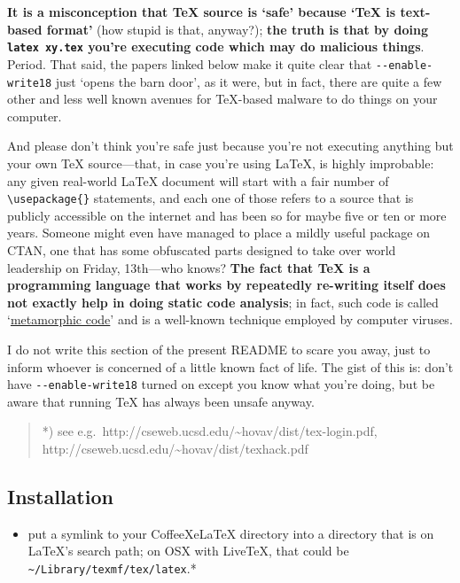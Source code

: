 \textbf{It is a misconception that TeX source is `safe' because `TeX is
text-based format'} (how stupid is that, anyway?); \textbf{the truth is
that by doing \texttt{latex xy.tex} you're executing code which may do
malicious things}. Period. That said, the papers linked below make it
quite clear that \texttt{-{}-enable-write18} just `opens the barn door',
as it were, but in fact, there are quite a few other and less well known
avenues for TeX-based malware to do things on your computer.

And please don't think you're safe just because you're not executing
anything but your own TeX source---that, in case you're using LaTeX, is
highly improbable: any given real-world LaTeX document will start with a
fair number of \texttt{\textbackslash{}usepackage\{\}} statements, and
each one of those refers to a source that is publicly accessible on the
internet and has been so for maybe five or ten or more years. Someone
might even have managed to place a mildly useful package on CTAN, one
that has some obfuscated parts designed to take over world leadership on
Friday, 13th---who knows? \textbf{The fact that TeX is a programming
language that works by repeatedly re-writing itself does not exactly
help in doing static code analysis}; in fact, such code is called
`\href{http://en.wikipedia.org/wiki/Metamorphic_code}{metamorphic code}'
and is a well-known technique employed by computer viruses.

I do not write this section of the present README to scare you away,
just to inform whoever is concerned of a little known fact of life. The
gist of this is: don't have \texttt{-{}-enable-write18} turned on except
you know what you're doing, but be aware that running TeX has always
been unsafe anyway.

\begin{quote}
*) see
e.g.~http://cseweb.ucsd.edu/\textasciitilde{}hovav/dist/tex-login.pdf,
http://cseweb.ucsd.edu/\textasciitilde{}hovav/dist/texhack.pdf
\end{quote}

\subsection{Installation}\label{installation}

\begin{itemize}
\itemsep1pt\parskip0pt
\item
  put a symlink to your CoffeeXeLaTeX directory into a directory that is
  on LaTeX's search path; on OSX with LiveTeX, that could be
  \texttt{\textasciitilde{}/Library/texmf/tex/latex}.*
\end{itemize}

